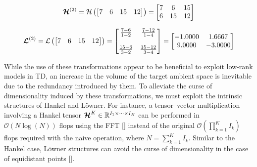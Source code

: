 \documentclass[sensors,article,submit,moreauthors,pdftex]{Definitions/mdpi}
\newcommand{\mathten}[1]{\boldsymbol{\mathbf{\mathcal{\MakeUppercase{#1}}}}}
\begin{document}
\begin{equation}
	\mathten{H}^{(2)} = \mathcal{H}\left(
	\begin{bmatrix}
		7 & 6 & 15 & 12
	\end{bmatrix}
	\right) =
	\begin{bmatrix}
	7 & 6 & 15 \\
	6 & 15 & 12
	\end{bmatrix}
	\label{eq:hankelsample}
\end{equation}

\begin{equation}
	\mathten{L}^{(2)} = \mathcal{L}\left(
	\begin{bmatrix}
	7 & 6 & 15 & 12
	\end{bmatrix}
	\right) = 
	\begin{bmatrix}
	\frac{7-6}{1-2} &  \frac{7-12}{1-4} \\
	\\
	 \frac{15-6}{3-2} & \frac{15-12}{3-4}
	\end{bmatrix}
	=
	\begin{bmatrix}
	-1.0000 &  1.6667 \\
	9.0000 & -3.0000
	\end{bmatrix}	
	\label{eq:loewnersample}
\end{equation}

While the use of these transformations appear to be beneficial to exploit low-rank models in TD, an increase in the volume of the target ambient space is inevitable due to the redundancy introduced by them. To alleviate the curse of dimensionality induced by these transformations, we must exploit the intrinsic structures of Hankel and L{\"o}wner. For instance, a tensor–vector multiplication involving a Hankel tensor $\mathten{H}^{K} \in \mathbb{R}^{I_1 \times \cdots \times I_K}$ can be performed in $\mathcal{O}(N \log(N))$ flops using the FFT [] instead of the original $\mathcal{O}(\prod_{k=1}^{K} I_k)$ flops required with the naive operation, where $N=\sum_{k=1}^{K} I_k$. Similar to the Hankel case, L{\"o}wner structures can avoid the curse of dimensionality in the case of equidistant points [].

\end{document}
